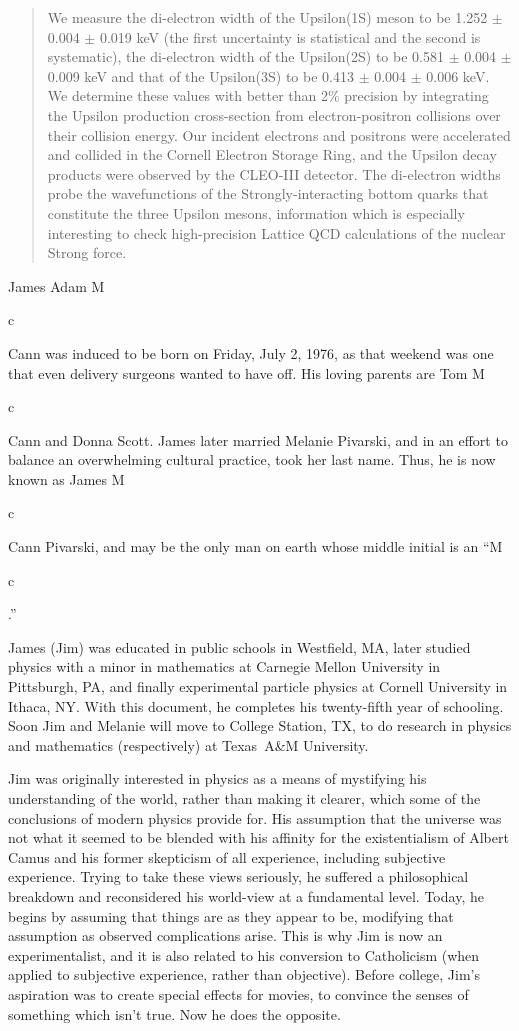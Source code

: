 \documentclass{cornell}
\newlength{\Mheight}
\newlength{\cwidth}
\newcommand{\emc}{\settoheight{\Mheight}{M}\settowidth{\cwidth}{c}M\parbox[b][\Mheight][t]{\cwidth}{c}}
\begin{document}
\maketitle
\makecopyright
\begin{abstract}
  We measure the di-electron width of the Upsilon(1S) meson to be
  1.252 $\pm$ 0.004 $\pm$ 0.019 keV (the first uncertainty is
  statistical and the second is systematic), the di-electron width of
  the Upsilon(2S) to be 0.581 $\pm$ 0.004 $\pm$ 0.009 keV and that of
  the Upsilon(3S) to be 0.413 $\pm$ 0.004 $\pm$ 0.006 keV.  We
  determine these values with better than 2\% precision by integrating
  the Upsilon production cross-section from electron-positron
  collisions over their collision energy.  Our incident electrons and
  positrons were accelerated and collided in the Cornell Electron
  Storage Ring, and the Upsilon decay products were observed by the
  CLEO-III detector.  The di-electron widths probe the wavefunctions
  of the Strongly-interacting bottom quarks that constitute the three
  Upsilon mesons, information which is especially interesting to check
  high-precision Lattice QCD calculations of the nuclear Strong force.
\end{abstract}
\begin{biosketch}
  James Adam \emc Cann was induced to be born on Friday, July
  2, 1976, as that weekend was one that even delivery surgeons wanted
  to have off.  His loving parents are Tom \emc Cann and
  Donna Scott.  James later married Melanie Pivarski, and in an effort
  to balance an overwhelming cultural practice, took her last name.
  Thus, he is now known as James \emc Cann Pivarski, and may
  be the only man on earth whose middle initial is an
  ``\emc.''

  James (Jim) was educated in public schools in Westfield, MA, later
  studied physics with a minor in mathematics at Carnegie Mellon
  University in Pittsburgh, PA, and finally experimental particle
  physics at Cornell University in Ithaca, NY.  With this document, he
  completes his twenty-fifth year of schooling.  Soon Jim and Melanie
  will move to College Station, TX, to do research in physics and
  mathematics (respectively) at Texas~A\&M University.
  
  Jim was originally interested in physics as a means of mystifying
  his understanding of the world, rather than making it clearer, which
  some of the conclusions of modern physics provide for.  His
  assumption that the universe was not what it seemed to be blended
  with his affinity for the existentialism of Albert Camus and his
  former skepticism of all experience, including subjective
  experience.  Trying to take these views seriously, he suffered a
  philosophical breakdown and reconsidered his world-view at a
  fundamental level.  Today, he begins by assuming that things are as
  they appear to be, modifying that assumption as observed
  complications arise.  This is why Jim is now an experimentalist, and
  it is also related to his conversion to Catholicism (when applied to
  subjective experience, rather than objective).  Before college,
  Jim's aspiration was to create special effects for movies, to
  convince the senses of something which isn't true.  Now he does the
  opposite.
\end{biosketch}
\end{document}
